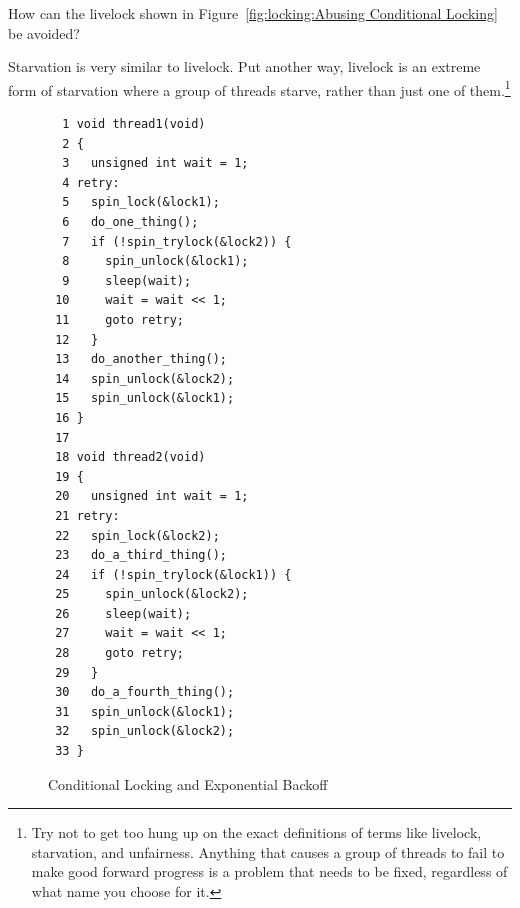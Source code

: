 \QuickQuiz{}
	How can the livelock shown in
	Figure~\ref{fig:locking:Abusing Conditional Locking}
	be avoided?
 \QuickQuizEnd

Starvation is very similar to livelock.
Put another way, livelock is an extreme form of starvation where
a group of threads starve, rather than just one of them.\footnote{
	Try not to get too hung up on the exact definitions of terms
	like livelock, starvation, and unfairness.
	Anything that causes a group of threads to fail to make good
	forward progress is a problem that needs to be fixed, regardless
	of what name you choose for it.}

\begin{figure}[tbp]
{ \scriptsize
\begin{verbatim}
  1 void thread1(void)
  2 {
  3   unsigned int wait = 1;
  4 retry:
  5   spin_lock(&lock1);
  6   do_one_thing();
  7   if (!spin_trylock(&lock2)) {
  8     spin_unlock(&lock1);
  9     sleep(wait);
 10     wait = wait << 1;
 11     goto retry;
 12   }
 13   do_another_thing();
 14   spin_unlock(&lock2);
 15   spin_unlock(&lock1);
 16 }
 17 
 18 void thread2(void)
 19 {
 20   unsigned int wait = 1;
 21 retry:
 22   spin_lock(&lock2);
 23   do_a_third_thing();
 24   if (!spin_trylock(&lock1)) {
 25     spin_unlock(&lock2);
 26     sleep(wait);
 27     wait = wait << 1;
 28     goto retry;
 29   }
 30   do_a_fourth_thing();
 31   spin_unlock(&lock1);
 32   spin_unlock(&lock2);
 33 }
\end{verbatim}
}
\caption{Conditional Locking and Exponential Backoff}
\label{fig:locking:Conditional Locking and Exponential Backoff}
\end{figure}

